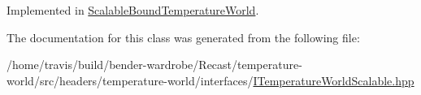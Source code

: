 Implemented in \hyperlink{class_scalable_bound_temperature_world_a9ac7291c4a2ff3d60042c518f1ae2858}{Scalable\-Bound\-Temperature\-World}.



The documentation for this class was generated from the following file\-:\begin{DoxyCompactItemize}
\item 
/home/travis/build/bender-\/wardrobe/\-Recast/temperature-\/world/src/headers/temperature-\/world/interfaces/\hyperlink{_i_temperature_world_scalable_8hpp}{I\-Temperature\-World\-Scalable.\-hpp}\end{DoxyCompactItemize}
